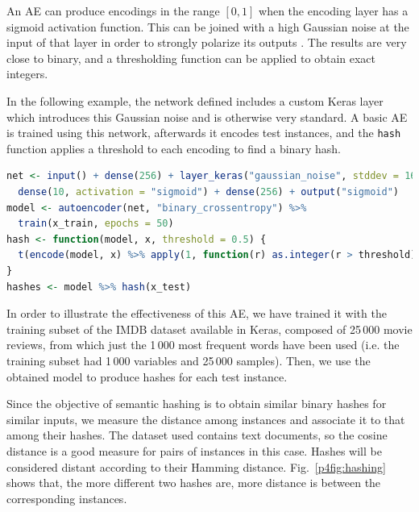 An AE can produce encodings in the range $[0,1]$ when the encoding layer has a sigmoid activation function. This can be joined with a high Gaussian noise at the input of that layer in order to strongly polarize its outputs \cite{hinton}. The results are very close to binary, and a thresholding function can be applied to obtain exact integers.

In the following example, the network defined includes a custom Keras layer which introduces this Gaussian noise and is otherwise very standard. A basic AE is trained using this network, afterwards it encodes test instances, and the \texttt{hash} function applies a threshold to each encoding to find a binary hash.

\begin{lstlisting}[language=R]
net <- input() + dense(256) + layer_keras("gaussian_noise", stddev = 16) +
  dense(10, activation = "sigmoid") + dense(256) + output("sigmoid")
model <- autoencoder(net, "binary_crossentropy") %>% 
  train(x_train, epochs = 50)
hash <- function(model, x, threshold = 0.5) {
  t(encode(model, x) %>% apply(1, function(r) as.integer(r > threshold)))
}
hashes <- model %>% hash(x_test)
\end{lstlisting}

In order to illustrate the effectiveness of this AE, we have trained it with the training subset of the IMDB dataset available in Keras, composed of 25\,000 movie reviews, from which just the 1\,000 most frequent words have been used (i.e. the training subset had 1\,000 variables and 25\,000 samples). Then, we use the obtained model to produce hashes for each test instance. 

Since the objective of semantic hashing is to obtain similar binary hashes for similar inputs, we measure the distance among instances and associate it to that among their hashes. The dataset used contains text documents, so the cosine distance is a good measure for pairs of instances in this case. Hashes will be considered distant according to their Hamming distance. Fig.~\ref{p4fig:hashing} shows that, the more different two hashes are, more distance is between the corresponding instances. %

